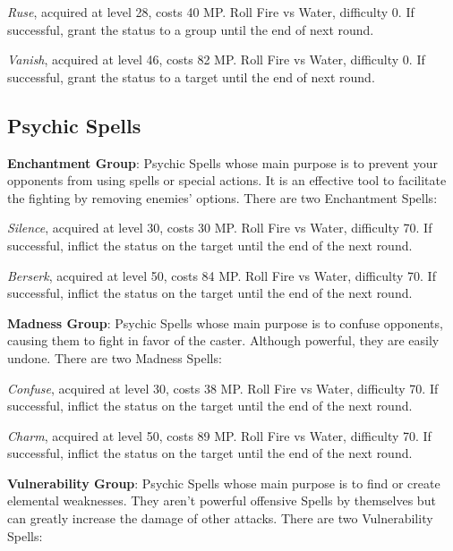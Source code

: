 \begin{multicols}{2}
    \textit{Ruse}, acquired at level 28, costs 40 MP\@. Roll Fire vs Water, difficulty 0. If successful, grant the  status to a group until the end of next round.

    \textit{Vanish}, acquired at level 46, costs 82 MP\@. Roll Fire vs Water, difficulty 0. If successful, grant the  status to a target until the end of next round.

    \subsection{Psychic Spells}\label{subsec:white-psychic}

    \textbf{Enchantment Group}: Psychic Spells whose main purpose is to prevent your opponents from using spells or special actions. It is an effective tool to facilitate the fighting by removing enemies’ options. There are two Enchantment Spells:

    \textit{Silence}, acquired at level 30, costs 30 MP\@. Roll Fire vs Water, difficulty 70. If successful, inflict the  status on the target until the end of the next round.

    \textit{Berserk}, acquired at level 50, costs 84 MP\@. Roll Fire vs Water, difficulty 70. If successful, inflict the  status on the target until the end of the next round.

    \ffcrystal[type=level,height=8pt]

    \textbf{Madness Group}: Psychic Spells whose main purpose is to confuse opponents, causing them to fight in favor of the caster. Although powerful, they are easily undone. There are two Madness Spells:

    \textit{Confuse}, acquired at level 30, costs 38 MP\@. Roll Fire vs Water, difficulty 70. If successful, inflict the  status on the target until the end of the next round.

    \textit{Charm}, acquired at level 50, costs 89 MP\@. Roll Fire vs Water, difficulty 70. If successful, inflict the  status on the target until the end of the next round.

    \ffcrystal[type=level,height=8pt]

    \textbf{Vulnerability Group}: Psychic Spells whose main purpose is to find or create elemental weaknesses. They aren’t powerful offensive Spells by themselves but can greatly increase the damage of other attacks. There are two Vulnerability Spells:


\end{multicols}
